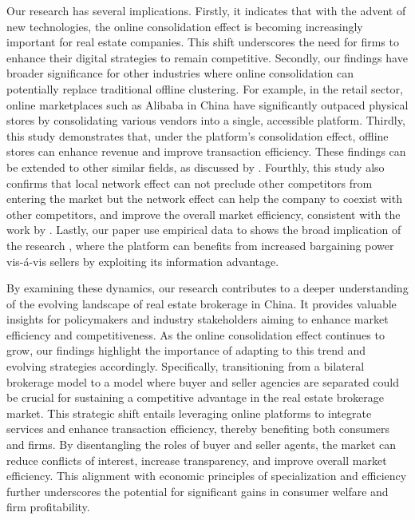 \documentclass[11pt]{article}
\begin{document}
Our research has several implications. Firstly, it indicates that with the advent of new technologies, the online consolidation effect is becoming increasingly important for real estate companies. This shift underscores the need for firms to enhance their digital strategies to remain competitive. Secondly, our findings have broader significance for other industries where online consolidation can potentially replace traditional offline clustering. For example, in the retail sector, online marketplaces such as Alibaba in China have significantly outpaced physical stores by consolidating various vendors into a single, accessible platform. Thirdly, this study demonstrates that, under the platform's consolidation effect, offline stores can enhance revenue and improve transaction efficiency. These findings can be extended to other similar fields, as discussed by \citep{10.1257/jep.28.2.3}. Fourthly, this study also confirms that local network effect can not preclude other competitors from entering the market but the network effect can help the company to coexist with other competitors, and improve the overall market efficiency, consistent with the work by \citep{gilbukh_goldsmith-pinkham_2019}. Lastly, our paper use empirical data to shows the broad implication of the research \citep{bergemann_data_2024}, where the platform can benefits from increased bargaining power vis-\'a-vis sellers by exploiting its information advantage.

By examining these dynamics, our research contributes to a deeper understanding of the evolving landscape of real estate brokerage in China. It provides valuable insights for policymakers and industry stakeholders aiming to enhance market efficiency and competitiveness. As the online consolidation effect continues to grow, our findings highlight the importance of adapting to this trend and evolving strategies accordingly. Specifically, transitioning from a bilateral brokerage model to a model where buyer and seller agencies are separated could be crucial for sustaining a competitive advantage in the real estate brokerage market. This strategic shift entails leveraging online platforms to integrate services and enhance transaction efficiency, thereby benefiting both consumers and firms. By disentangling the roles of buyer and seller agents, the market can reduce conflicts of interest, increase transparency, and improve overall market efficiency. This alignment with economic principles of specialization and efficiency further underscores the potential for significant gains in consumer welfare and firm profitability.
\end{document}
